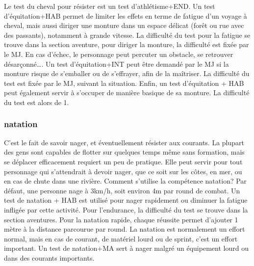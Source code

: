 \documentclass[10pt,a4paper,twocolumn]{book}
\begin{document}
Le test du cheval pour résister est un test d’athlétisme+END.
Un test d’équitation+HAB permet de limiter les effets en terme de fatigue d’un voyage à cheval, mais aussi diriger une monture dans un espace délicat (forêt ou rue avec des passants), notamment à grande vitesse. La difficulté du test pour la fatigue se trouve dans la section aventure, pour diriger la monture, la difficulté est fixée par le MJ. En cas d’échec, le personnage peut percuter un obstacle, se retrouver désarçonné….
Un test d’équitation+INT peut être demandé par le MJ si la monture risque de s’emballer ou de s’effrayer, afin de la maîtriser. La difficulté du test est fixée par le MJ, suivant la situation.
Enfin, un test d’équitation + HAB peut également servir à s’occuper de manière basique de sa monture. La difficulté du test est alors de 1.
\subsubsection{natation}
C’est le fait de savoir nager, et éventuellement résister aux courants. La plupart des gens sont capables de flotter sur quelques temps même sans formation, mais se déplacer efficacement requiert un peu de pratique. Elle peut servir pour tout personnage qui s’attendrait à devoir nager, que ce soit sur les côtes, en mer, ou en cas de chute dans une rivière.
Comment s’utilise la compétence natation?
Par défaut, une personne nage à 3km/h, soit environ 4m par round de combat.
Un test de natation + HAB est utilisé pour nager rapidement ou diminuer la fatigue infligée par cette activité. Pour l’endurance, la difficulté du test se trouve dans la section aventures. Pour la natation rapide, chaque réussite permet d’ajouter 1 mètre à la distance parcourue par round. La natation est normalement un effort normal, mais en cas de courant, de matériel lourd ou de sprint, c’est un effort important.
Un test de natation+MA sert à nager malgré un équipement lourd ou dans des courants importants.
\end{document}
